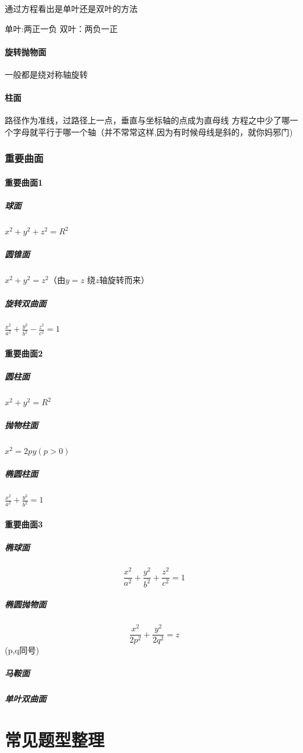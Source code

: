 \documentclass[UTF8]{ctexart}
\begin{document}
通过方程看出是单叶还是双叶的方法

单叶:两正一负 双叶：两负一正

\paragraph{旋转抛物面}
一般都是绕对称轴旋转
\paragraph{柱面}
路径作为准线，过路径上一点，垂直与坐标轴的点成为直母线
方程之中少了哪一个字母就平行于哪一个轴（并不常常这样,因为有时候母线是斜的，就你妈邪门)

\subsubsection{重要曲面}

\paragraph{重要曲面1}

\subparagraph{球面}

$x^2 + y^2 + z^2 = R^2$

\subparagraph{圆锥面}
$x^2 + y^2 = z^2$（由$y = z$ 绕$z$轴旋转而来）

\subparagraph{旋转双曲面} 
$\frac{x^2}{a^2} + \frac{y^2}{b^2} - \frac{z^2}{c^2} = 1$

\paragraph{重要曲面2}

\subparagraph{圆柱面}
$x^2 + y^2 = R^2$

\subparagraph{抛物柱面}
$x^2 = 2py(p>0)$
\subparagraph{椭圆柱面}
$\frac{x^2}{a^2} + \frac{y^2}{b^2} = 1$

\paragraph{重要曲面3}

\subparagraph{椭球面}  
$$\frac{x^2}{a^2} + \frac{y^2}{b^2} + \frac{z^2}{c^2} = 1$$
\subparagraph{椭圆抛物面} 
$$\frac{x^2}{2p^2} + \frac{y^2}{2q^2} = z$$ (p,q同号)
\subparagraph{马鞍面}
\subparagraph{单叶双曲面}
\section{常见题型整理}
\end{document}
